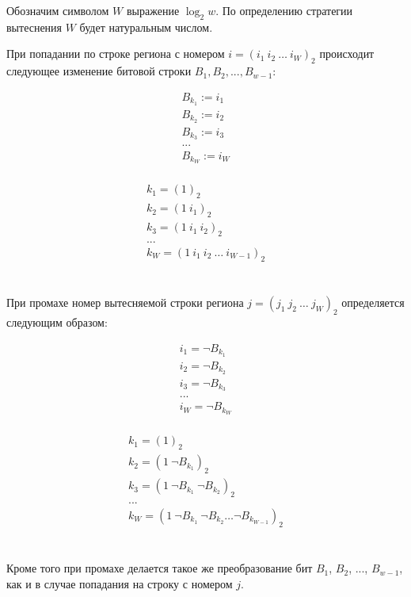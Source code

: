 Обозначим символом $W$ выражение $\log_2 w$. По определению
стратегии вытеснения \PseudoLRU $W$ будет натуральным числом.

\begin{utv}\label{wMinus1PseudoLRU}При попадании по строке региона с номером $i = (i_1~i_2~\dots~i_W)_2$ происходит следующее изменение битовой строки $B_1,
B_2, ..., B_{w{-}1}$:

\parbox{0.3\textwidth}{
  $$ \begin{array}{l}
  B_{k_1} := i_1 \\
  B_{k_2} := i_2 \\
  B_{k_3} := i_3 \\
  ...\\
  B_{k_W} := i_W \\
  \end{array}$$
} \vline
\parbox{0.7\textwidth}{
  $$ \begin{array}{l}
  k_1 = (1)_2 \\
  k_2 = (1~i_1)_2 \\
  k_3 = (1~i_1~i_2)_2 \\
  ...\\
  k_W = (1~i_1~i_2~\dots~i_{W{-}1})_2 \\
  \end{array} $$
}
\\[1cm]

При промахе номер вытесняемой строки региона $j = (j_1~j_2~\dots~j_W)_2$ определяется следующим образом:

\parbox{0.3\textwidth}{
  $$ \begin{array}{l}
  i_1 = \neg B_{k_1} \\
  i_2 = \neg B_{k_2} \\
  i_3 = \neg B_{k_3} \\
  ...\\
  i_W = \neg B_{k_W} \\
  \end{array}$$
} \vline
\parbox{0.7\textwidth}{
  $$ \begin{array}{l}
  k_1 = (1)_2 \\
  k_2 = (1~\neg B_{k_1})_2 \\
  k_3 = (1~\neg B_{k_1}~\neg B_{k_2})_2 \\
  ...\\
  k_W = (1~\neg B_{k_1}~\neg B_{k_2}\dots\neg B_{k_{W{-}1}})_2 \\
  \end{array} $$
}
\\[0.5cm]

Кроме того при промахе делается такое же преобразование бит $B_1$, $B_2$, ..., $B_{w{-}1}$, как и в случае попадания на строку с номером $j$.
\end{utv}

